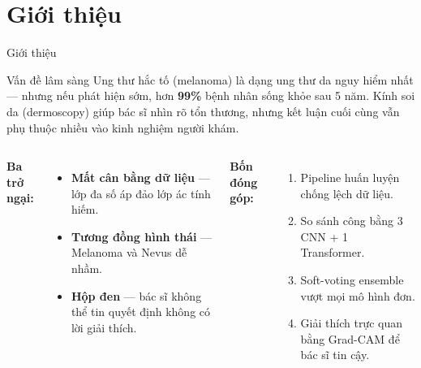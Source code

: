 \documentclass[10pt, aspectratio=169]{beamer}
\renewcommand{\framesubtitle}[1]{%
  \vspace*{-0.3em}\noindent{\large\bfseries\textcolor{usthdark}{#1}}\par\vspace{0.6em}%
}
\begin{document}
\section{Giới thiệu}
\begin{frame}{Giới thiệu}
    \framesubtitle{Vấn đề và mục tiêu}
    \begin{block}{Vấn đề lâm sàng}
        \small
        Ung thư hắc tố (melanoma) là dạng ung thư da nguy hiểm nhất --- nhưng nếu phát hiện sớm, hơn \textbf{99\%} bệnh nhân sống khỏe sau 5 năm. Kính soi da (dermoscopy) giúp bác sĩ nhìn rõ tổn thương, nhưng kết luận cuối cùng vẫn phụ thuộc nhiều vào kinh nghiệm người khám.
    \end{block}
    \vspace{0.15cm}
    \begin{columns}[T]
        \textbf{Ba trở ngại:}
        \begin{itemize}\footnotesize
            \item \textbf{Mất cân bằng dữ liệu} --- lớp đa số áp đảo lớp ác tính hiếm.
            \item \textbf{Tương đồng hình thái} --- Melanoma và Nevus dễ nhầm.
            \item \textbf{Hộp đen} --- bác sĩ không thể tin quyết định không có lời giải thích.
        \end{itemize}

        \textbf{Bốn đóng góp:}
        \begin{enumerate}\footnotesize
            \item Pipeline huấn luyện chống lệch dữ liệu.
            \item So sánh công bằng 3 CNN + 1 Transformer.
            \item Soft-voting ensemble vượt mọi mô hình đơn.
            \item Giải thích trực quan bằng Grad-CAM để bác sĩ tin cậy.
        \end{enumerate}
    \end{columns}
\end{frame}

\end{document}
